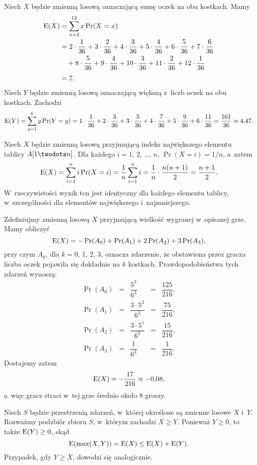 
\exercise %
Niech $X$ będzie zmienną losową oznaczającą sumę oczek na obu kostkach.
Mamy
\begin{align*}
	\operatorname{E}(X) &= \sum_{x=2}^{12}x\Pr(X=x) \\
	&= 2\cdot\frac{1}{36}+3\cdot\frac{2}{36}+4\cdot\frac{3}{36}+5\cdot\frac{4}{36}+6\cdot\frac{5}{36}+7\cdot\frac{6}{36} \\
	&\quad {}+8\cdot\frac{5}{36}+9\cdot\frac{4}{36}+10\cdot\frac{3}{36}+11\cdot\frac{2}{36}+12\cdot\frac{1}{36} \\[1mm]
	&= 7.
\end{align*}
Niech $Y$ będzie zmienną losową oznaczającą większą z~liczb oczek na obu kostkach.
Zachodzi
\[
	\operatorname{E}(Y) = \sum_{y=1}^{6}y\Pr(Y=y) = 1\cdot\frac{1}{36}+2\cdot\frac{3}{36}+3\cdot\frac{5}{36}+4\cdot\frac{7}{36}+5\cdot\frac{9}{36}+6\cdot\frac{11}{36} = \frac{161}{36} \approx 4{,}47.
\]

\exercise %
Niech $X$ będzie zmienną losową przyjmującą indeks największego elementu tablicy $A[1\twodots n]$.
Dla każdego $i=1$, 2, \dots, $n$, $\Pr(X=i)=1/n$, a~zatem
\[
	\operatorname{E}(X) = \sum_{i=1}^ni\Pr(X=i) = \frac{1}{n}\sum_{i=1}^ni = \frac{1}{n}\cdot\frac{n(n+1)}{2} = \frac{n+1}{2}.
\]
W~rzeczywistości wynik ten jest identyczny dla każdego elementu tablicy, w~szczególności dla elementów największego i~najmniejszego.

\exercise %
Zdefiniujmy zmienną losową $X$ przyjmującą wielkość wygranej w~opisanej grze.
Mamy obliczyć
\[
	\operatorname{E}(X) = -\Pr(A_0)+\Pr(A_1)+2\Pr(A_2)+3\Pr(A_3),
\]
przy czym $A_k$, dla $k=0$, 1, 2, 3, oznacza zdarzenie, że obstawiona przez gracza liczba oczek pojawiła się dokładnie na $k$ kostkach.
Prawdopodobieństwa tych zdarzeń wynoszą:
\[
	\begin{array}{ccccc}
	\Pr(A_0) &=& \dfrac{5^3}{6^3} &=& \dfrac{125}{216}, \\[3mm]
	\Pr(A_1) &=& \dfrac{3\cdot 5^2}{6^3} &=& \dfrac{75}{216}, \\[3mm]
	\Pr(A_2) &=& \dfrac{3\cdot 5^1}{6^3} &=& \dfrac{15}{216}, \\[3mm]
	\Pr(A_3) &=& \dfrac{1}{6^3} &=& \dfrac{1}{216}.
	\end{array}
\]
Dostajemy zatem
\[
	\operatorname{E}(X) = -\dfrac{17}{216} \approx -0{,}08,
\]
a~więc gracz straci w~tej grze średnio około 8 groszy.

\exercise %
Niech $S$ będzie przestrzenią zdarzeń, w~której określone są zmienne losowe $X$ i~$Y$.
Rozważmy podzbiór zbioru $S$, w~którym zachodzi $X\ge Y$.
Ponieważ $Y\ge0$, to także $\operatorname{E}(Y)\ge0$, skąd
\[
    \operatorname{E}(\max(X,Y)) = \operatorname{E}(X) \le \operatorname{E}(X)+\operatorname{E}(Y).
\]
Przypadek, gdy $Y\ge X$, dowodzi się analogicznie.

